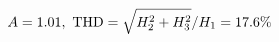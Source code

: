 \documentclass[preview]{standalone}
\begin{document}
\begin{align*}
\special{dvisvgm:raw <g id='unique000'>}A=1.01,\ \text{THD}=\sqrt{H_2^2+H_3^2}/H_1=17.6\%\special{dvisvgm:raw </g>}
\end{align*}
\end{document}
